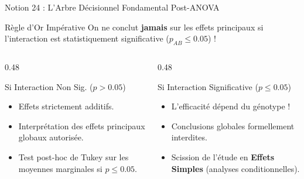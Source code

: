 \documentclass[aspectratio=169,10pt]{beamer}
\begin{document}
\begin{frame}{Notion 24 : L'Arbre Décisionnel Fondamental Post-ANOVA}
  \begin{warnbox}{Règle d'Or Impérative}
    \small
    On ne conclut \textbf{jamais} sur les effets principaux si l'interaction est statistiquement significative ($p_{AB} \le 0.05$) !
  \end{warnbox}
  \vspace{1mm}
  \begin{columns}[onlytextwidth, T]
    \begin{column}{0.48\linewidth}
      \begin{conceptbox}{Si Interaction Non Sig. ($p > 0.05$)}
        \small
        \begin{itemize}
          \item Effets strictement additifs.
          \item Interprétation des effets principaux globaux autorisée.
          \item Test post-hoc de Tukey sur les moyennes marginales si $p \le 0.05$.
        \end{itemize}
      \end{conceptbox}
    \end{column}
    \begin{column}{0.48\linewidth}
      \begin{biobox}{Si Interaction Significative ($p \le 0.05$)}
        \small
        \begin{itemize}
          \item L'efficacité dépend du génotype !
          \item Conclusions globales formellement interdites.
          \item Scission de l'étude en \textbf{Effets Simples} (analyses conditionnelles).
        \end{itemize}
      \end{biobox}
    \end{column}
  \end{columns}
\end{frame}
\end{document}
